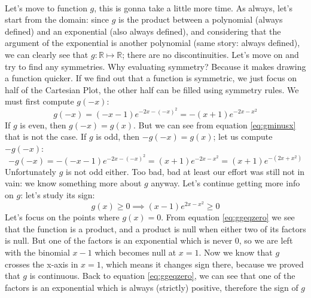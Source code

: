 \paragraph{}
Let's move to function $g$, this is gonna take a little more time. As
always, let's start from the domain: since $g$ is the product between
a polynomial (always defined) and an exponential (also always defined),
and considering that the argument of the exponential is another polynomial
(same story: always defined), we can clearly see that
$g : \mathbb{R} \mapsto \mathbb{R}$; there are no discontinuities.
Let's move on and try to find any
symmetries.
Why evaluating symmetry? Because it makes drawing a function quicker.
If we find out that a function is symmetric,
we just focus on half of the Cartesian Plot, the other half can be
filled using symmetry rules.
We must first compute $g(-x)$:
\begin{equation}\label{eq:gminusx}
    g(-x) = (-x - 1)e^{-2x - (-x)^2} = -(x + 1)e^{-2x - x^2}
\end{equation}
If $g$ is even, then $g(-x) = g(x)$. But we can see from equation
\ref{eq:gminusx} that is not the case.
If $g$ is odd, then $-g(-x) = g(x)$; let us compute $-g(-x)$:
\begin{equation*}
    -g(-x) = -(-x - 1)e^{-2x - (-x)^2} = (x + 1)e^{-2x - x^2}
        = (x + 1)e^{-(2x + x^2)}
\end{equation*}
Unfortunately $g$ is not odd either. Too bad, bad at least our effort was
still not in vain: we know something more about $g$ anyway.
Let's continue getting more info on $g$: let's study its sign:
\begin{equation}\label{eq:ggeqzero}
    g(x) \geq 0 \implies (x - 1)e^{2x - x^2} \geq 0
\end{equation}
Let's focus on the points where $g(x) = 0$. From equation
\ref{eq:ggeqzero} we see that the function is a product, and a
product is null when either two of its factors is null. But one of the
factors is an exponential which is never $0$, so we are left
with the binomial $x-1$ which becomes null at $x = 1$. Now we know
that $g$ crosses the x-axis in $x = 1$, which means it changes sign
there, because we proved that $g$ is continuous. Back
to equation \ref{eq:ggeqzero}, we can see that one of the factors
is an exponential which is always (strictly) positive,
therefore the sign of $g$
